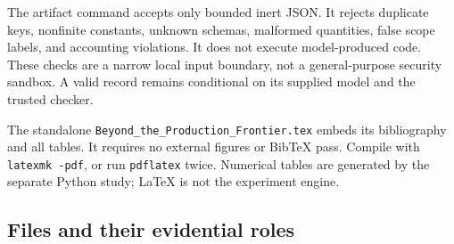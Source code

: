 \documentclass[11pt,letterpaper]{article}
\newcommand{\1}{\mathbf 1}
\theoremstyle{remark}\newtheorem{remark}{Remark}[section]
\begin{document}
The artifact command accepts only bounded inert JSON. It rejects duplicate keys, nonfinite constants, unknown schemas, malformed quantities, false scope labels, and accounting violations. It does not execute model-produced code. These checks are a narrow local input boundary, not a general-purpose security sandbox. A valid record remains conditional on its supplied model and the trusted checker.

The standalone \texttt{Beyond\_the\_Production\_Frontier.tex} embeds its bibliography and all tables. It requires no external figures or BibTeX pass. Compile with \texttt{latexmk -pdf}, or run \texttt{pdflatex} twice. Numerical tables are generated by the separate Python study; LaTeX is not the experiment engine.

\subsection{Files and their evidential roles}
\end{document}
